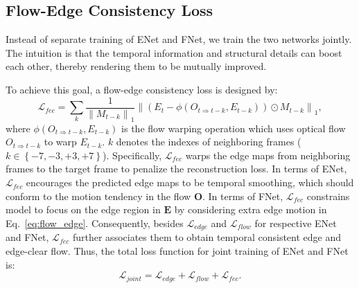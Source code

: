 \subsection{Flow-Edge Consistency Loss}
Instead of separate training of ENet and FNet, we train the two networks jointly.
The intuition is that the temporal information and structural details can boost each other, thereby rendering them to be mutually improved.

To achieve this goal, a flow-edge consistency loss is designed by:
\begin{equation}
\label{eq:flow_edge}
\mathcal{L}_{fec}=\sum_{k}\frac{1}{\left\|M_{t-k} \right\|_1}\left\|(E_{t}-\phi(O_{t\Rightarrow t-k},E_{t-k}))\odot M_{t-k}\right\|_1,
\end{equation}
where $\phi(O_{t\Rightarrow t-k},E_{t-k})$ is the flow warping operation which uses optical flow $O_{t\Rightarrow t-k}$ to warp $E_{t-k}$.
$k$ denotes the indexes of neighboring frames ($k\in \left\{-7,-3,+3,+7 \right\}$). 
Specifically, $\mathcal{L}_{fec}$ warps the edge maps from neighboring frames to the target frame to penalize the reconstruction loss.
In terms of ENet, $\mathcal{L}_{fec}$ encourages the predicted edge maps to be temporal smoothing, which should conform to the motion tendency in the flow $\boldsymbol{O}$. 
In terms of FNet, $\mathcal{L}_{fec}$ constrains model to focus on the edge region in $\boldsymbol{E}$ by considering extra edge motion in Eq.~\ref{eq:flow_edge}. 
Consequently, besides $\mathcal{L}_{edge}$ and $\mathcal{L}_{flow}$ for respective ENet and FNet, $\mathcal{L}_{fec}$ further associates them to obtain temporal consistent edge and edge-clear flow.
Thus, the total loss function for joint training of ENet and FNet is:
\begin{equation}
\label{eq:flow}
\mathcal{L}_{joint}=\mathcal{L}_{edge}+\mathcal{L}_{flow}+\mathcal{L}_{fec}.
\end{equation}







